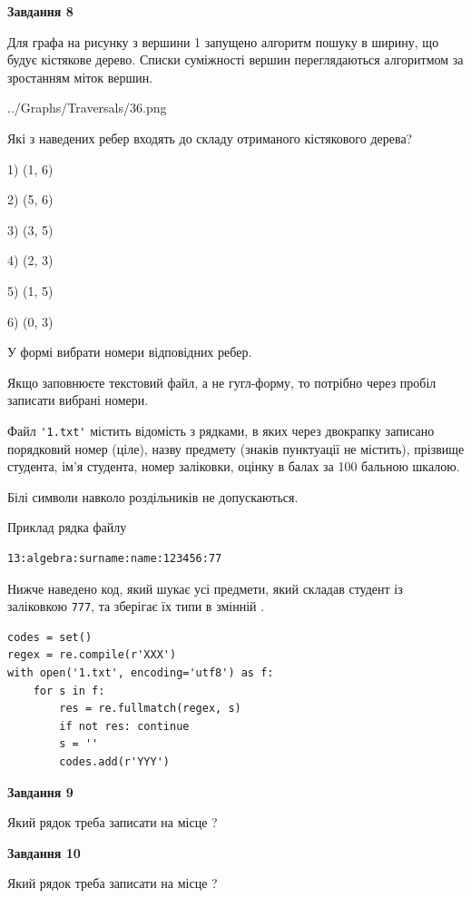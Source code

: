 \documentclass[12pt, ukrainian]{article}
\def\code#1{\Verb!#1!}
\begin{document}
{\begin {large}
{\begin {center}\textbf{Завдання 8}\end {center}}\par
Для графа на рисунку з вершини 1 запущено алгоритм пошуку в ширину, що будує кістякове дерево. Списки суміжності вершин переглядаються алгоритмом за зростанням міток вершин.\par
\begin{center}
	{../Graphs/Traversals/36.png}
\end{center}
\par Які з наведених ребер входять до складу отриманого кістякового дерева?\par
1) (1, 6)\par
2) (5, 6)\par
3) (3, 5)\par
4) (2, 3)\par
5) (1, 5)\par
6) (0, 3)\par
{\vskip 15pt} У формі вибрати номери відповідних ребер.


Якщо заповнюєте текстовий файл, а не гугл-форму, то потрібно через пробіл записа\-ти вибрані номери.\par
\newpage


Файл \code{'1.txt'} містить відомість з рядками, в яких через двокрапку записано поряд\-ковий номер (ціле), назву предмету (знаків пунктуації не містить), прізвище студента, ім'я студента, номер заліковки, оцінку в балах за 100 бальною шкалою.

Білі символи навколо роздільників не допускаються.

Приклад рядка файлу



\begin{verbatim}
13:algebra:surname:name:123456:77
\end{verbatim}


Нижче наведено код, який шукає усі предмети, який складав студент із заліковкою \code{777}, та зберігає їх типи в змінній .



\begin{verbatim}
codes = set()
regex = re.compile(r'XXX')
with open('1.txt', encoding='utf8') as f:
    for s in f:
        res = re.fullmatch(regex, s)
        if not res: continue
        s = ''
        codes.add(r'YYY')
\end{verbatim}


{\begin {center}\textbf{Завдання 9}\end {center}}\par
Який рядок треба записати на місце  ?\par
\vspace{5mm}


{\begin {center}\textbf{Завдання 10}\end {center}}\par
Який рядок треба записати на місце  ?\par


\newpage


\end {large}}
\end{document}
